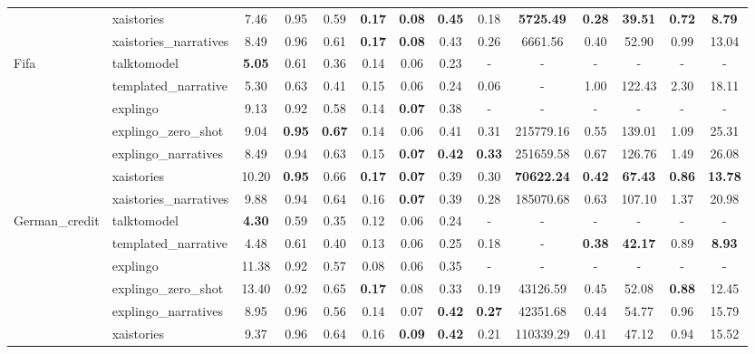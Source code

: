 \begin{table}[th!]
{\begin{tabular}{llcccccccccccc}
     & xaistories & 7.46 & 0.95 & 0.59 & \textbf{0.17} & \textbf{0.08} & \textbf{0.45} & 0.18 & \textbf{5725.49} & \textbf{0.28} & \textbf{39.51} & \textbf{0.72} & \textbf{8.79}\\
     & xaistories\_narratives & 8.49 & 0.96 & 0.61 & \textbf{0.17} & \textbf{0.08} & 0.43 & 0.26 & 6661.56 & 0.40 & 52.90 & 0.99 & 13.04\\
    \midrule
    \multirow{7}{*}{Fifa} & talktomodel & \textbf{5.05} & 0.61 & 0.36 & 0.14 & 0.06 & 0.23 & - & - & - & - & - & -\\
     & templated\_narrative & 5.30 & 0.63 & 0.41 & 0.15 & 0.06 & 0.24 & 0.06 & - & 1.00 & 122.43 & 2.30 & 18.11\\
     & explingo & 9.13 & 0.92 & 0.58 & 0.14 & \textbf{0.07} & 0.38 & - & - & - & - & - & -\\
     & explingo\_zero\_shot & 9.04 & \textbf{0.95} & \textbf{0.67} & 0.14 & 0.06 & 0.41 & 0.31 & 215779.16 & 0.55 & 139.01 & 1.09 & 25.31\\
     & explingo\_narratives & 8.49 & 0.94 & 0.63 & 0.15 & \textbf{0.07} & \textbf{0.42} & \textbf{0.33} & 251659.58 & 0.67 & 126.76 & 1.49 & 26.08\\
     & xaistories & 10.20 & \textbf{0.95} & 0.66 & \textbf{0.17} & \textbf{0.07} & 0.39 & 0.30 & \textbf{70622.24} & \textbf{0.42} & \textbf{67.43} & \textbf{0.86} & \textbf{13.78}\\
     & xaistories\_narratives & 9.88 & 0.94 & 0.64 & 0.16 & \textbf{0.07} & 0.39 & 0.28 & 185070.68 & 0.63 & 107.10 & 1.37 & 20.98\\
    \midrule
    \multirow{7}{*}{German\_credit} & talktomodel & \textbf{4.30} & 0.59 & 0.35 & 0.12 & 0.06 & 0.24 & - & - & - & - & - & -\\
     & templated\_narrative & 4.48 & 0.61 & 0.40 & 0.13 & 0.06 & 0.25 & 0.18 & - & \textbf{0.38} & \textbf{42.17} & 0.89 & \textbf{8.93}\\
     & explingo & 11.38 & 0.92 & 0.57 & 0.08 & 0.06 & 0.35 & - & - & - & - & - & -\\
     & explingo\_zero\_shot & 13.40 & 0.92 & 0.65 & \textbf{0.17} & 0.08 & 0.33 & 0.19 & 43126.59 & 0.45 & 52.08 & \textbf{0.88} & 12.45\\
     & explingo\_narratives & 8.95 & 0.96 & 0.56 & 0.14 & 0.07 & \textbf{0.42} & \textbf{0.27} & 42351.68 & 0.44 & 54.77 & 0.96 & 15.79\\
     & xaistories & 9.37 & 0.96 & 0.64 & 0.16 & \textbf{0.09} & \textbf{0.42} & 0.21 & 110339.29 & 0.41 & 47.12 & 0.94 & 15.52\\

\end{tabular}}
\end{table}
